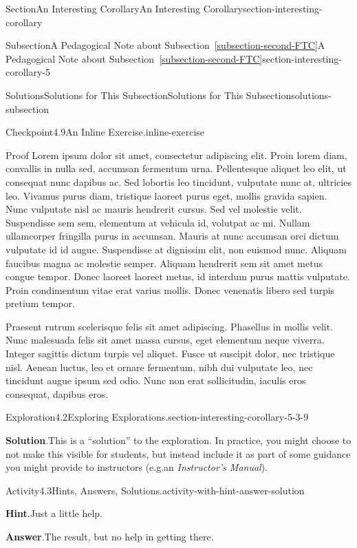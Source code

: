 \documentclass[twoside,10pt,]{article}
\newcommand{\blocktitlefont}{\relax}
\newcommand{\xreffont}{\relax}
\newcommand{\pubtitle}[1]{\textsl{#1}}
\numberwithin{equation}{section}
\begin{document}
\begin{sectionptx}{Section}{An Interesting Corollary}{}{An Interesting Corollary}{}{}{section-interesting-corollary}
\begin{subsectionptx}{Subsection}{A Pedagogical Note about Subsection~{\xreffont\ref*{subsection-second-FTC}}}{}{A Pedagogical Note about Subsection~{\xreffont\ref*{subsection-second-FTC}}}{}{}{section-interesting-corollary-5}
\begin{solutions-subsubsection}{Solutions}{Solutions for This Subsection}{}{Solutions for This Subsection}{}{}{solutions-subsection}
\begin{inlinesolution}{Checkpoint}{4.9}{An Inline Exercise.}{inline-exercise}
\begin{solutionproof}{Proof}
Lorem ipsum dolor sit amet, consectetur adipiscing elit. Proin lorem diam, convallis in nulla sed, accumsan fermentum urna. Pellentesque aliquet leo elit, ut consequat nunc dapibus ac. Sed lobortis leo tincidunt, vulputate nunc at, ultricies leo. Vivamus purus diam, tristique laoreet purus eget, mollis gravida sapien. Nunc vulputate nisl ac mauris hendrerit cursus. Sed vel molestie velit. Suspendisse sem sem, elementum at vehicula id, volutpat ac mi. Nullam ullamcorper fringilla purus in accumsan. Mauris at nunc accumsan orci dictum vulputate id id augue. Suspendisse at dignissim elit, non euismod nunc. Aliquam faucibus magna ac molestie semper. Aliquam hendrerit sem sit amet metus congue tempor. Donec laoreet laoreet metus, id interdum purus mattis vulputate. Proin condimentum vitae erat varius mollis. Donec venenatis libero sed turpis pretium tempor.%
\par
Praesent rutrum scelerisque felis sit amet adipiscing. Phasellus in mollis velit. Nunc malesuada felis sit amet massa cursus, eget elementum neque viverra. Integer sagittis dictum turpis vel aliquet. Fusce ut suscipit dolor, nec tristique nisl. Aenean luctus, leo et ornare fermentum, nibh dui vulputate leo, nec tincidunt augue ipsum sed odio. Nunc non erat sollicitudin, iaculis eros consequat, dapibus eros.%
\end{solutionproof}
\end{inlinesolution}%
\begin{explorationsolution}{Exploration}{4.2}{Exploring Explorations.}{section-interesting-corollary-5-3-9}%
\par\smallskip%
\noindent\textbf{\blocktitlefont Solution}.\hypertarget{section-interesting-corollary-5-3-9-3-main}{}\quad{}This is a ``solution'' to the exploration.  In practice, you might choose to not make this visible for students, but instead include it as part of some guidance you might provide to instructors (e.g.\@ an \pubtitle{Instructor's Manual}).%
\end{explorationsolution}%
\begin{activitysolution}{Activity}{4.3}{Hints, Answers, Solutions.}{activity-with-hint-answer-solution}%
\par\smallskip%
\noindent\textbf{\blocktitlefont Hint}.\hypertarget{activity-with-hint-answer-solution-4-main}{}\quad{}Just a little help.%
\par\smallskip%
\noindent\textbf{\blocktitlefont Answer}.\hypertarget{activity-with-hint-answer-solution-5-main}{}\quad{}The result, but no help in getting there.%
\par\smallskip%

\end{activitysolution}
\end{solutions-subsubsection}
\end{subsectionptx}
\end{sectionptx}
\end{document}
